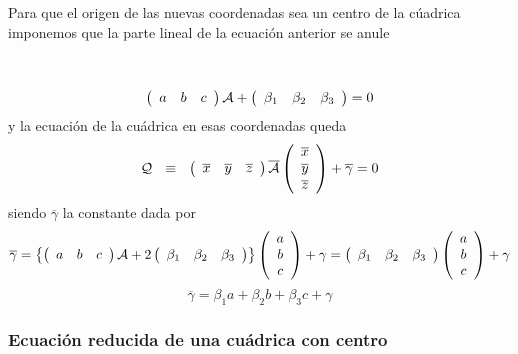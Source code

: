 \documentclass[11pt, a4paper]{article}
\newif\IfInSansMode
\theoremstyle{theorem-style}
\theoremstyle{definition-style}
\theoremstyle{remark-style}
\theoremstyle{example-style}
\begin{document}
\vspace{.3cm}

Para que el origen de las nuevas coordenadas sea un centro de la c\'uadrica imponemos que la parte lineal de la ecuaci\'on anterior se anule

\

\[
{
\left( \begin{array}{ccc} 
a &  b &  c 
 \end{array} \right){\cal A}
+
 \left( \begin{array}{ccc}
\beta_1 & \beta_2 & \beta_3   
 \end{array} \right)
=0 }
\]
y la ecuaci\'on de la cu\'adrica en esas coordenadas queda
\[
{\cal Q} \, \, \, \, \equiv \, \, \, \,
\left(\begin{array}{ccc} 
\overline{x} & \overline{y} & \overline{z}   
 \end{array} \right){\overline{\cal A}}
\left(\begin{array}{c}
\overline{x} \\
\overline{y} \\
\overline{z}  
\end{array} \right) + \overline{\gamma} = 0
\]
siendo $\overline{\gamma}$ la constante dada por
\[
\overline{\gamma} = 
\left\{
\left( \begin{array}{ccc} 
a &  b &  c 
 \end{array} \right){\cal A}
+
 2\left( \begin{array}{ccc}
\beta_1 & \beta_2 & \beta_3   
 \end{array} \right)\right\}
\left( \begin{array}{c}
a \\
b \\
c  
 \end{array} \right)
+\gamma = 
\left( \begin{array}{ccc}
\beta_1 & \beta_2 & \beta_3   
 \end{array} \right)
\left( \begin{array}{c}
a \\
b \\
c  
 \end{array} \right)+\gamma
\]
\[
{ 
\overline{\gamma} =
\beta_1 a+ \beta_2 b+ \beta_3  c 
+\gamma
}
\]

\subsubsection{\bf Ecuaci\'on reducida de una cu\'adrica con centro}
\end{document}
